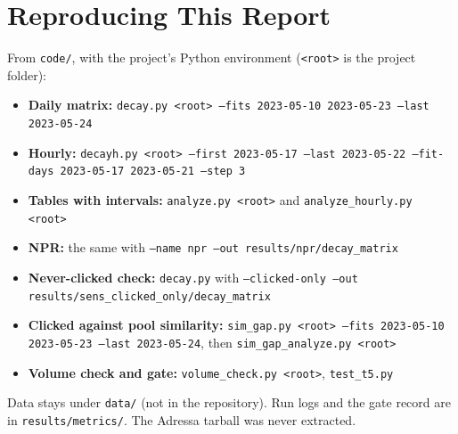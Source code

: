 \documentclass[11pt,a4paper]{article}
\begin{document}
\section{Reproducing This Report}
\raggedright From \texttt{code/}, with the project's Python environment (\texttt{<root>} is the project folder):
\begin{itemize}
\item \textbf{Daily matrix:} \texttt{decay.py <root> --fits 2023-05-10 2023-05-23 --last 2023-05-24}
\item \textbf{Hourly:} \texttt{decayh.py <root> --first 2023-05-17 --last 2023-05-22 --fit-days 2023-05-17 2023-05-21 --step 3}
\item \textbf{Tables with intervals:} \texttt{analyze.py <root>} and \texttt{analyze\_hourly.py <root>}
\item \textbf{NPR:} the same with \texttt{--name npr --out results/npr/decay\_matrix}
\item \textbf{Never-clicked check:} \texttt{decay.py} with \texttt{--clicked-only --out results/sens\_clicked\_only/decay\_matrix}
\item \textbf{Clicked against pool similarity:} \texttt{sim\_gap.py <root> --fits 2023-05-10 2023-05-23 --last 2023-05-24}, then \texttt{sim\_gap\_analyze.py <root>}
\item \textbf{Volume check and gate:} \texttt{volume\_check.py <root>}, \texttt{test\_t5.py}
\end{itemize}
Data stays under \texttt{data/} (not in the repository). Run logs and the gate record are in \texttt{results/metrics/}. The Adressa tarball was never extracted.
\end{document}
